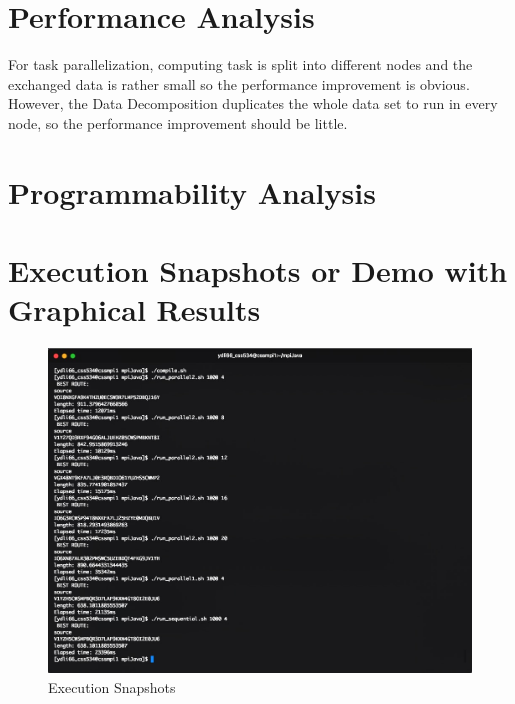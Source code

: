 \documentclass[11pt,a4paper]{report}
\begin{document}
\section{Performance Analysis}
For task parallelization, computing task is split into different nodes and the exchanged data is rather small so the performance improvement is obvious. However, the Data Decomposition duplicates the whole data set to run in every node, so the performance improvement should be little.

\section{Programmability Analysis}

\section{Execution Snapshots or Demo with Graphical Results}
\begin{figure}[!htp]
	\centering
	\includegraphics[width=0.7\linewidth]{running}
	\caption{Execution Snapshots}
	\label{fig:running}
\end{figure}







%
%
\end{document}
